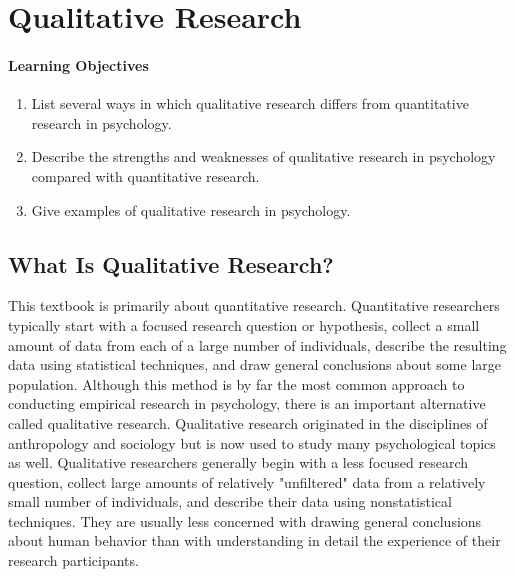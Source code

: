 \newpage
\section{Qualitative Research}


\paragraph{Learning Objectives}
 \begin{enumerate}
 \item List several ways in which qualitative research differs from quantitative research in psychology.
 \item Describe the strengths and weaknesses of qualitative research in psychology compared with quantitative research.
 \item  Give examples of qualitative research in psychology.
   \end{enumerate}


\subsection{What Is Qualitative Research?}

This textbook is primarily about quantitative research. Quantitative researchers typically start with a focused research question or hypothesis, collect a small amount of data from each of a large number of individuals, describe the resulting data using statistical techniques, and draw general conclusions about some large population. Although this method is by far the most common approach to conducting empirical research in psychology, there is an important alternative called qualitative research. Qualitative research originated in the disciplines of anthropology and sociology but is now used to study many psychological topics as well. Qualitative researchers generally begin with a less focused research question, collect large amounts of relatively "unfiltered" data from a relatively small number of individuals, and describe their data using nonstatistical techniques. They are usually less concerned with drawing general conclusions about human behavior than with understanding in detail the experience of their research participants.

